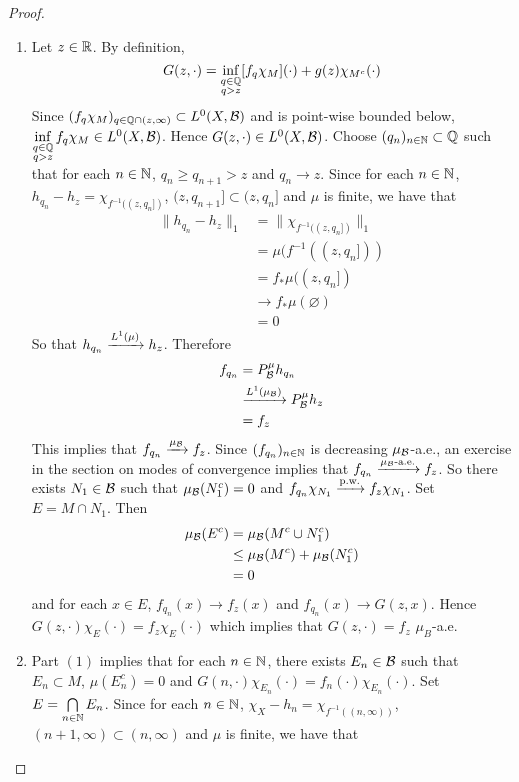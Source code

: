 \documentclass{book}
\begin{document}
	\begin{proof}\
		\begin{enumerate}
			\item Let $z \in \mathbb{R}$. By definition,
			$$G(z, \cdot) = \inf\limits_{\substack{q \in \mathbb{Q} \\ q > z}}[ f_q \chi_M ] (\cdot) + g(z) \chi_{M^c}(\cdot)$$ 
			Since $(f_{q} \chi_{M})_{q \in \mathbb{Q}\cap (z, \infty)} \subset L^0(X, \mathcal{B})$ and is point-wise bounded below, $\inf\limits_{\substack{q \in \mathbb{Q} \\ q > z}} f_q \chi_M  \in L^0(X, \mathcal{B})$. Hence $G(z, \cdot) \in L^0(X, \mathcal{B})$. Choose $(q_n)_{n \in \mathbb{N}} \subset \mathbb{Q}$ such that for each $n \in \mathbb{N}$, $q_n \geq q_{n+1} > z$ and $q_n \rightarrow z$. Since for each $n \in \mathbb{N}$, $h_{q_n} - h_{z} = \chi_{f^{-1}((z, q_n])}$, $(z, q_{n+1}] \subset (z, q_n]$ and $\mu$ is finite, we have that 
			\begin{align*}
				\|h_{q_n} - h_z\|_1
				& = \|\chi_{f^{-1}((z, q_n])}\|_1 \\
				& = \mu(f^{-1}((z, q_n])) \\
				& = f_* \mu ((z, q_n]) \\
				& \rightarrow f_* \mu(\varnothing) \\
				& = 0
			\end{align*}
			So that $h_{q_n} \xrightarrow{L^1(\mu)} h_z$. Therefore  
			\begin{align*}
				f_{q_n} 
				& = P^{\mu}_{\mathcal{B}} h_{q_n} \\
				& \xrightarrow{L^1(\mu_{\mathcal{B}})} P^{\mu}_{\mathcal{B}} h_z \\
				& = f_z
			\end{align*}
			This implies that $f_{q_n} \xrightarrow{\mu_{\mathcal{B}}} f_z$. Since $(f_{q_n})_{n \in \mathbb{N}}$ is decreasing $\mu_{\mathcal{B}}$-a.e., an exercise in the section on modes of convergence implies that $f_{q_n} \xrightarrow{\text{$\mu_{\mathcal{B}}$-a.e.}} f_z$. So there exists $N_1 \in \mathcal{B}$ such that $\mu_{\mathcal{B}}(N_1^c) = 0$ and $f_{q_n} \chi_{N_1} \xrightarrow{\text{p.w.}} f_z \chi_{N_1}$. Set $E = M \cap N_1$. Then  
			\begin{align*}
				\mu_{\mathcal{B}}(E^c)
				& = \mu_{\mathcal{B}}(M^c \cup N_1^c) \\ 
				& \leq \mu_{\mathcal{B}}(M^c) + \mu_{\mathcal{B}}(N_1^c) \\
				& = 0
			\end{align*}
			and for each $x \in E$, $f_{q_n}(x) \rightarrow f_z(x)$ and $f_{q_n}(x) \rightarrow G(z, x)$. Hence $G(z, \cdot)\chi_{E}(\cdot) = f_z \chi_{E}( \cdot)$ which implies that $G(z, \cdot) = f_z$ $\mu_B$-a.e.\\
			\item Part $(1)$ implies that for each $n \in \mathbb{N}$, there exists $E_n \in \mathcal{B}$ such that $E_n \subset M$, $\mu(E_n^c) = 0$ and $G(n, \cdot)\chi_{E_n}(\cdot) = f_n(\cdot) \chi_{E_n}(\cdot)$. Set $E = \bigcap\limits_{n \in \mathbb{N}} E_n$. Since for each $n \in \mathbb{N}$, $\chi_{X} - h_n = \chi_{f^{-1}((n, \infty))}$, $(n+1, \infty) \subset (n, \infty)$ and $\mu$ is finite, we have that 

\end{enumerate}
\end{proof}
\end{document}
